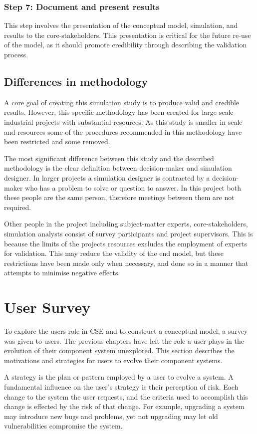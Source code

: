 \subsubsection{Step 7: Document and present results}
This step involves the presentation of the conceptual model, simulation, and results to the core-stakeholders.
This presentation is critical for the future re-use of the model, as it should promote credibility through describing the validation process.

\subsection{Differences in methodology}
A core goal of creating this simulation study is to produce valid and credible results.
However, this specific methodology has been created for large scale industrial projects with substantial resources.
As this study is smaller in scale and resources some of the procedures recommended in this methodology have been restricted and some removed.

The most significant difference between this study and the described methodology is the clear definition between decision-maker and simulation designer.
In larger projects a simulation designer is contracted by a decision-maker who has a problem to solve or question to answer.
In this project both these people are the same person, therefore meetings between them are not required.

Other people in the project including subject-matter experts, core-stakeholders, simulation analysts consist of survey participants and project supervisors.
This is because the limits of the projects resources excludes the employment of experts for validation.
This may reduce the validity of the end model, but these restrictions have been made only when necessary,
and done so in a manner that attempts to minimise negative effects.


\section{User Survey}
\label{strat.usersurvey}
To explore the users role in CSE and to construct a conceptual model, a survey was given to users.
The previous chapters have left the role a user plays in the evolution of their component system unexplored.
This section describes the motivations and strategies for users to evolve their component systems.

A strategy is the plan or pattern employed by a user to evolve a system.
A fundamental influence on the user's strategy is their perception of risk.
Each change to the system the user requests, and the criteria used to accomplish this change is effected by the risk of that change.
For example, upgrading a system may introduce new bugs and problems, yet not upgrading may let old vulnerabilities compromise the system.

